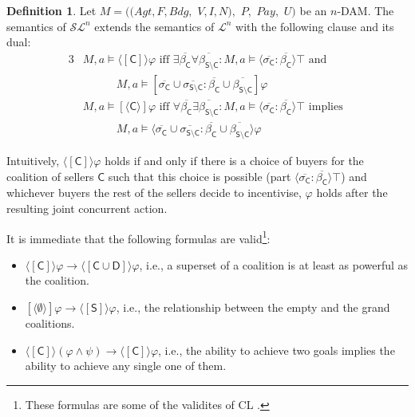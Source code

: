\documentclass[letterpaper]{article} %
\theoremstyle{definition}
\newtheorem{definition}{Definition}
\newcommand{\Pay}{\mathit{Pay}}
\begin{document}
\begin{definition}
Let $M = ((Agt, F, Bdg,$ $V, I, N),$ $P,$ $\Pay,$ $U)$ be an $n$-DAM. The semantics of $\mathcal{SL}^n$ extends the semantics of $\mathcal{L}^n$ with the following clause and its dual:
    \begin{alignat*}{3}
        &M,a \models \langle \! [\mathsf{C}] \! \rangle \varphi \text{ iff } \exists \overline{\beta_\mathsf{C}}\forall \overline{\beta_{\mathsf{S \setminus C}}}: %
        M,a \models \langle \overline{\sigma_{\mathsf{C}}}: \overline{\beta_{\mathsf{C}}} \rangle \top \text{ and }\\ 
        & \qquad \quad %
        M,a \models [{\overline{\sigma_\mathsf{C}}\cup \overline{\sigma_{\mathsf{S \setminus C}}}:\overline{\beta_\mathsf{C}}\cup \overline{\beta_{\mathsf{S \setminus C}}}} ] \varphi\\
        &M,a \models [ \! \langle\mathsf{C}\rangle \! ] \varphi \text{ iff } \forall \overline{\beta_\mathsf{C}}\exists \overline{\beta_{\mathsf{S \setminus C}}}: %
        M,a \models \langle \overline{\sigma_{\mathsf{C}}}: \overline{\beta_{\mathsf{C}}} \rangle \top \text{ implies }\\ 
        & \qquad \quad M,a \models \langle {\overline{\sigma_\mathsf{C}}\cup \overline{\sigma_{\mathsf{S \setminus C}}}:\overline{\beta_\mathsf{C}}\cup \overline{\beta_{\mathsf{S \setminus C}}}} \rangle \varphi
\end{alignat*}     
\end{definition}

Intuitively, $\langle \! [\mathsf{C}] \! \rangle \varphi$ holds if and only if there is a choice of buyers for the coalition of sellers $\mathsf{C}$ such that this choice is possible (part $\langle \overline{\sigma_{\mathsf{C}}}: \overline{\beta_{\mathsf{C}}} \rangle \top$) and whichever buyers the rest of the sellers decide to incentivise, $\varphi$ holds after the resulting joint concurrent action. 

It is immediate %
that the following formulas are valid\footnote{These formulas are some of the validites of CL \cite{pauly02}.}:
\begin{itemize}
    \item $\langle \! [\mathsf{C}] \! \rangle \varphi \to \langle \! [\mathsf{C} \cup \mathsf{D}] \! \rangle \varphi$, i.e., a superset of a coalition is at least as powerful as the coalition.
    \item $[ \! \langle\mathsf{\emptyset}\rangle \! ] \varphi \to \langle \! [\mathsf{S}] \! \rangle \varphi$, i.e., the relationship between the empty and the grand coalitions.
    \item $\langle \! [\mathsf{C}] \! \rangle (\varphi \land \psi) \to \langle \! [\mathsf{C}] \! \rangle \varphi$, i.e., the ability to achieve two goals implies the ability to achieve any single one of them.
\end{itemize}
\end{document}
